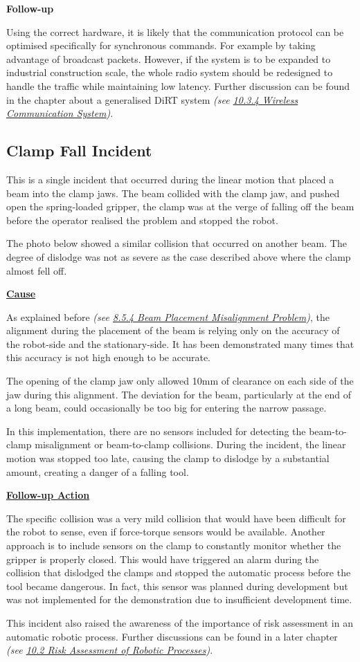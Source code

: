 


\textbf{Follow-up}

Using the correct hardware, it is likely that the communication protocol can be optimised specifically for synchronous commands. For example by taking advantage of broadcast packets. However, if the system is to be expanded to industrial construction scale, the whole radio system should be redesigned to handle the traffic while maintaining low latency. Further discussion can be found in the chapter about a generalised DiRT system \textit{(see \ul{10.3.4 Wireless Communication System})}. 

\subsection{Clamp Fall Incident}

This is a single incident that occurred during the linear motion that placed a beam into the clamp jaws. The beam collided with the clamp jaw, and pushed open the spring-loaded gripper, the clamp was at the verge of falling off the beam before the operator realised the problem and stopped the robot.

The photo below showed a similar collision that occurred on another beam. The degree of dislodge was not as severe as the case described above where the clamp almost fell off.




\textbf{\ul{Cause}}

As explained before \textit{(see \ul{8.5.4 Beam Placement Misalignment Problem})}, the alignment during the placement of the beam is relying only on the accuracy of the robot-side and the stationary-side. It has been demonstrated many times that this accuracy is not high enough to be accurate. 

The opening of the clamp jaw only allowed 10mm of clearance on each side of the jaw during this alignment. The deviation for the beam, particularly at the end of a long beam, could occasionally be too big for entering the narrow passage.

In this implementation, there are no sensors included for detecting the beam-to-clamp misalignment or beam-to-clamp collisions. During the incident, the linear motion was stopped too late, causing the clamp to dislodge by a substantial amount, creating a danger of a falling tool.

\textbf{\ul{Follow-up Action}}

The specific collision was a very mild collision that would have been difficult for the robot to sense, even if force-torque sensors would be available. Another approach is to include sensors on the clamp to constantly monitor whether the gripper is properly closed. This would have triggered an alarm during the collision that dislodged the clamps and stopped the automatic process before the tool became dangerous. In fact, this sensor was planned during development but was not implemented for the demonstration due to insufficient development time. 

This incident also raised the awareness of the importance of risk assessment in an automatic robotic process. Further discussions can be found in a later chapter \textit{(see \ul{10.2 Risk Assessment of Robotic Processes})}.
